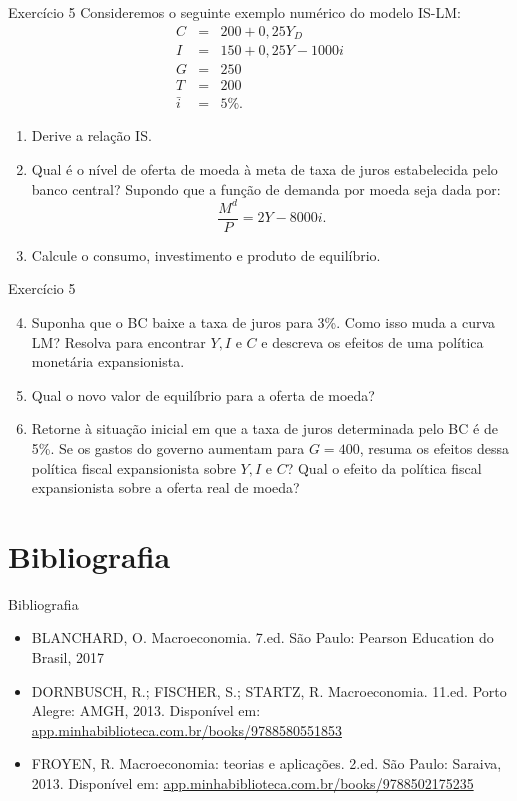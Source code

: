 \documentclass[10pt]{beamer}
\begin{document}
\begin{frame}[t]{Exercício 5}
Consideremos o seguinte exemplo numérico do modelo IS-LM:
\begin{eqnarray*}
C &=& 200 + 0,25Y_D \\
I &=& 150 + 0,25Y - 1000i \\
G &=& 250 \\
T &=& 200 \\
\bar{i} &=& 5\%.
\end{eqnarray*}
\begin{enumerate}
    \item Derive a relação IS.
    \bigskip
    \item Qual é o nível de oferta de moeda à meta de taxa de juros estabelecida pelo banco central? Supondo que a função de demanda por moeda seja dada por:
    \[
    \frac{M^d}{P} = 2Y - 8000i.
    \]
    \bigskip
    \item Calcule o consumo, investimento e produto de equilíbrio.
\end{enumerate}
\end{frame}

\begin{frame}[t]{Exercício 5}
    \begin{enumerate}
        \setcounter{enumi}{3}
        \item Suponha que o BC baixe a taxa de juros para 3\%. Como isso muda a curva LM? Resolva para encontrar $Y, I$ e $C$ e descreva os efeitos de uma política monetária expansionista.
        \bigskip
        \item Qual o novo valor de equilíbrio para a oferta de moeda?
        \bigskip
        \item Retorne à situação inicial em que a taxa de juros determinada pelo BC é de 5\%. Se os gastos do governo aumentam para $G = 400$, resuma os efeitos dessa política fiscal expansionista sobre $Y, I$ e $C$? Qual o efeito da política fiscal expansionista sobre a oferta real de moeda?
    \end{enumerate}
\end{frame}

\section{Bibliografia}
\begin{frame}{ Bibliografia}
    \begin{itemize}
        \item BLANCHARD, O. Macroeconomia. 7.ed. São Paulo: Pearson Education do Brasil, 2017\medskip        
        \item DORNBUSCH, R.; FISCHER, S.; STARTZ, R. Macroeconomia. 11.ed. Porto Alegre: AMGH, 2013. Disponível em: \href{https://app.minhabiblioteca.com.br/books/9788580551853}{app.minhabiblioteca.com.br/books/9788580551853}\medskip
        \item FROYEN, R. Macroeconomia: teorias e aplicações. 2.ed. São Paulo: Saraiva, 2013. Disponível em: \href{https://app.minhabiblioteca.com.br/books/9788502175235}{app.minhabiblioteca.com.br/books/9788502175235}\medskip        
    \end{itemize}
\end{frame}
\end{document}
